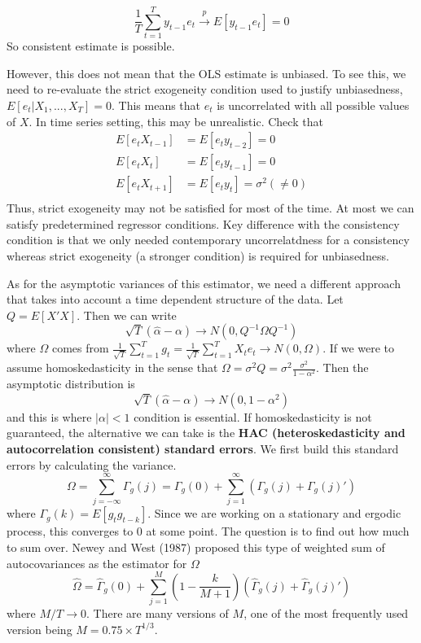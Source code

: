 \documentclass[12pt]{article}
\theoremstyle{definition}
\theoremstyle{property}
\theoremstyle{assumption}
\theoremstyle{example}
\theoremstyle{comment}
\begin{document}
\[
\frac{1}{T}\sum_{t=1}^T y_{t-1}e_t \xrightarrow{p} E[y_{t-1}e_t]=0
\]
So consistent estimate is possible. 
\par
However, this does not mean that the OLS estimate is unbiased. To see this, we need to re-evaluate the strict exogeneity condition used to justify unbiasedness, $E[e_t|X_1,...,X_T]=0$. This means that $e_t$ is uncorrelated with all possible values of $X$. In time series setting, this may be unrealistic. Check that
\[
\begin{aligned}
E[e_tX_{t-1}]&=E[e_ty_{t-2}]=0\\
E[e_tX_t]&=E[e_ty_{t-1}]=0\\
E[e_tX_{t+1}]&=E[e_ty_t]=\sigma^2(\neq0)\\
\end{aligned}
\]
Thus, strict exogeneity may not be satisfied for most of the time. At most we can satisfy predetermined regressor conditions. Key difference with the consistency condition is that we only needed contemporary uncorrelatdness for a consistency whereas strict exogeneity (a stronger condition) is required for unbiasedness. 
\par 
As for the asymptotic variances of this estimator, we need a different approach that takes into account a time dependent structure of the data.  Let $Q=E[X'X]$. Then we can write
\[
\sqrt{T}(\hat{\alpha}-\alpha)\to N(0,Q^{-1}\Omega Q^{-1})
\]
where $\Omega$ comes from $\frac{1}{\sqrt{T}}\sum_{t=1}^Tg_t=\frac{1}{\sqrt{T}}\sum_{t=1}^TX_te_t\to N(0,\Omega)$. If we were to assume homoskedasticity in the sense that $\Omega=\sigma^2Q=\sigma^2\frac{\sigma^2}{1-\alpha^2}$. Then the asymptotic distribution is
\[
\sqrt{T}(\hat{\alpha}-\alpha)\to N(0,1-\alpha^2)
\]
and this is where $|\alpha|<1$ condition is essential. If homoskedasticity is not guaranteed, the alternative we can take is the \textbf{HAC (heteroskedasticity and autocorrelation consistent) standard errors}. We first build this standard errors by calculating the variance.
\[
\Omega=\sum_{j=-\infty}^\infty\Gamma_g(j)=\Gamma_g(0)+\sum_{j=1}^\infty\left(\Gamma_g(j)+\Gamma_g(j)'\right)
\]
where $\Gamma_g(k)=E[g_tg_{t-k}]$. Since we are working on a stationary and ergodic process, this converges to 0 at some point. The question is to find out how much to sum over. Newey and West (1987) proposed this type of weighted sum of autocovariances as the estimator for $\Omega$
\[
\widehat{\Omega}=\widehat{\Gamma}_g(0)+\sum_{j=1}^M \left(1-\frac{k}{M+1}\right)\left(\widehat{\Gamma}_g(j)+\widehat{\Gamma}_g(j)'\right)
\]
where $M/T\to0$. There are many versions of $M$, one of the most frequently used version being $M=0.75\times T^{1/3}$. 
\end{document}
